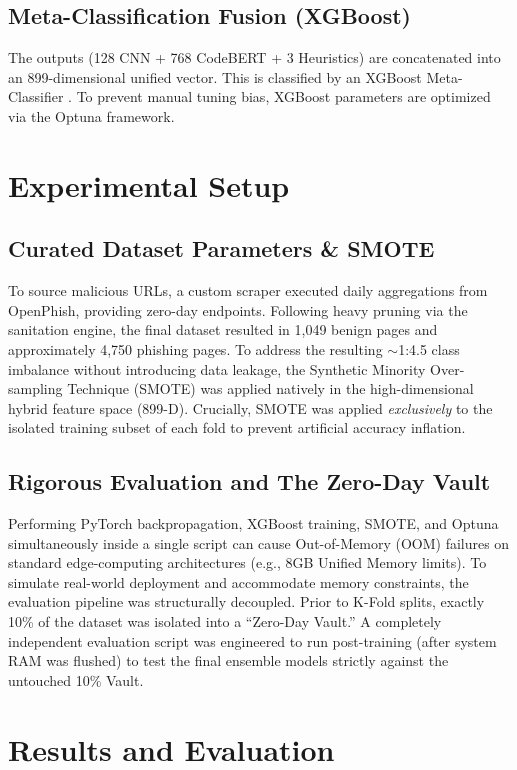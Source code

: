 \documentclass[conference]{IEEEtran}
\begin{document}
\subsection{Meta-Classification Fusion (XGBoost)}
The outputs (128 CNN + 768 CodeBERT + 3 Heuristics) are concatenated into an 899-dimensional unified vector. This is classified by an XGBoost Meta-Classifier \cite{xgboost}. To prevent manual tuning bias, XGBoost parameters are optimized via the Optuna framework.

\section{Experimental Setup}
\subsection{Curated Dataset Parameters \& SMOTE}
To source malicious URLs, a custom scraper executed daily aggregations from OpenPhish, providing zero-day endpoints. Following heavy pruning via the sanitation engine, the final dataset resulted in 1,049 benign pages and approximately 4,750 phishing pages. 
To address the resulting $\sim$1:4.5 class imbalance without introducing data leakage, the Synthetic Minority Over-sampling Technique (SMOTE) \cite{chawla} was applied natively in the high-dimensional hybrid feature space (899-D). Crucially, SMOTE was applied \textit{exclusively} to the isolated training subset of each fold to prevent artificial accuracy inflation.

\subsection{Rigorous Evaluation and The Zero-Day Vault}
Performing PyTorch backpropagation, XGBoost training, SMOTE, and Optuna simultaneously inside a single script can cause Out-of-Memory (OOM) failures on standard edge-computing architectures (e.g., 8GB Unified Memory limits). To simulate real-world deployment and accommodate memory constraints, the evaluation pipeline was structurally decoupled. Prior to K-Fold splits, exactly 10\% of the dataset was isolated into a ``Zero-Day Vault.'' A completely independent evaluation script was engineered to run post-training (after system RAM was flushed) to test the final ensemble models strictly against the untouched 10\% Vault.

\section{Results and Evaluation}
\end{document}
